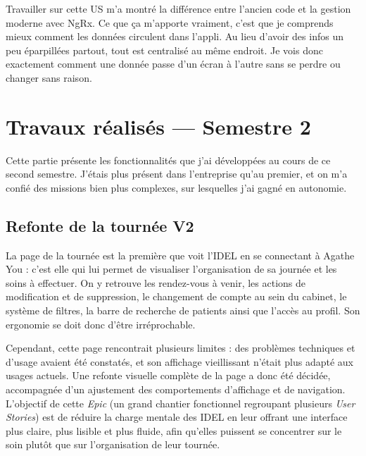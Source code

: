 \documentclass{article}
\begin{document}
Travailler sur cette US m'a montré la différence entre l'ancien code et la gestion moderne avec NgRx. Ce que ça m'apporte vraiment, c'est que je comprends mieux comment les données circulent dans l'appli. Au lieu d'avoir des infos un peu éparpillées partout, tout est centralisé au même endroit. Je vois donc exactement comment une donnée passe d'un écran à l'autre sans se perdre ou changer sans raison.

\section{Travaux réalisés --- Semestre 2}

Cette partie présente les fonctionnalités que j'ai développées au cours de ce second semestre. J'étais plus présent dans l'entreprise qu'au premier, et on m'a confié des missions bien plus complexes, sur lesquelles j'ai gagné en autonomie.

\subsection{Refonte de la tournée V2}
\label{subsec:tournee-v2}

La page de la tournée est la première que voit l'IDEL en se connectant à Agathe You : c'est elle qui lui permet de visualiser l'organisation de sa journée et les soins à effectuer. On y retrouve les rendez-vous à venir, les actions de modification et de suppression, le changement de compte au sein du cabinet, le système de filtres, la barre de recherche de patients ainsi que l'accès au profil. Son ergonomie se doit donc d'être irréprochable.


Cependant, cette page rencontrait plusieurs limites : des problèmes techniques et d'usage avaient été constatés, et son affichage vieillissant n'était plus adapté aux usages actuels. Une refonte visuelle complète de la page a donc été décidée, accompagnée d'un ajustement des comportements d'affichage et de navigation. L'objectif de cette \textit{Epic} (un grand chantier fonctionnel regroupant plusieurs \textit{User Stories}) est de réduire la charge mentale des IDEL en leur offrant une interface plus claire, plus lisible et plus fluide, afin qu'elles puissent se concentrer sur le soin plutôt que sur l'organisation de leur tournée.\\
\end{document}
